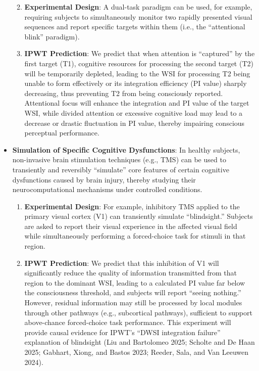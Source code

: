 \documentclass[
  a4paper]{article}
\providecommand{\tightlist}{%
  \setlength{\itemsep}{0pt}\setlength{\parskip}{0pt}}
\begin{document}
\begin{itemize}
  \begin{enumerate}
  \def\labelenumi{\arabic{enumi}.}
  \tightlist
  \item
    \textbf{Experimental Design}: A dual-task paradigm can be used, for
    example, requiring subjects to simultaneously monitor two rapidly
    presented visual sequences and report specific targets within them
    (i.e., the ``attentional blink'' paradigm).
  \item
    \textbf{IPWT Prediction}: We predict that when attention is
    ``captured'' by the first target (T1), cognitive resources for
    processing the second target (T2) will be temporarily depleted,
    leading to the WSI for processing T2 being unable to form
    effectively or its integration efficiency (PI value) sharply
    decreasing, thus preventing T2 from being consciously reported.
    Attentional focus will enhance the integration and PI value of the
    target WSI, while divided attention or excessive cognitive load may
    lead to a decrease or drastic fluctuation in PI value, thereby
    impairing conscious perceptual performance.
  \end{enumerate}
\item
  \textbf{Simulation of Specific Cognitive Dysfunctions}: In healthy
  subjects, non-invasive brain stimulation techniques (e.g., TMS) can be
  used to transiently and reversibly ``simulate'' core features of
  certain cognitive dysfunctions caused by brain injury, thereby
  studying their neurocomputational mechanisms under controlled
  conditions.

  \begin{enumerate}
  \def\labelenumi{\arabic{enumi}.}
  \tightlist
  \item
    \textbf{Experimental Design}: For example, inhibitory TMS applied to
    the primary visual cortex (V1) can transiently simulate
    ``blindsight.'' Subjects are asked to report their visual experience
    in the affected visual field while simultaneously performing a
    forced-choice task for stimuli in that region.
  \item
    \textbf{IPWT Prediction}: We predict that this inhibition of V1 will
    significantly reduce the quality of information transmitted from
    that region to the dominant WSI, leading to a calculated PI value
    far below the consciousness threshold, and subjects will report
    ``seeing nothing.'' However, residual information may still be
    processed by local modules through other pathways (e.g., subcortical
    pathways), sufficient to support above-chance forced-choice task
    performance. This experiment will provide causal evidence for IPWT's
    ``DWSI integration failure'' explanation of blindsight (Liu and
    Bartolomeo 2025; Scholte and De Haan 2025; Gabhart, Xiong, and
    Bastos 2023; Reeder, Sala, and Van Leeuwen 2024).
  \end{enumerate}
\end{itemize}
\end{document}
